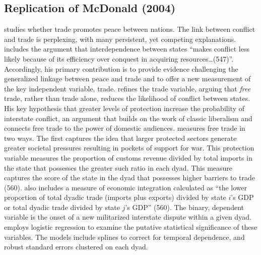 \subsection{Replication of McDonald (2004)}

\citet{mcdonald:2004} studies whether trade promotes peace between nations. The link between conflict and trade is perplexing, with many persistent, yet competing explanations. \citet{mcdonald:2004} includes the argument that interdependence between states ``makes conflict less likely because of its efficiency over conquest in acquiring resources\ldots (547)''. Accordingly, his primary contribution is to provide evidence challenging the generalized linkage between peace and trade and to offer a new measurement of the key independent variable, trade. \citet{mcdonald:2004} refines the trade variable, arguing that \textit{free} trade, rather than trade alone, reduces the likelihood of conflict between states. His key hypothesis that greater levels of protection increase the probability of interstate conflict, an argument that builds on the work of classic liberalism and connects free trade to the power of domestic audiences. \citet{mcdonald:2004} measures free trade in two ways. The first captures the idea that larger protected sectors generate greater societal pressures resulting in pockets of support for war. This protection variable measures the proportion of customs revenue divided by total imports in the state that possesses the greater such ratio in each dyad. This measure captures the score of the state in the dyad that possesses higher barriers to trade (560). \citet{mcdonald:2004} also includes a measure of economic integration  calculated as ``the lower proportion of total dyadic trade (imports plus exports) divided by state $i$'s GDP or total dyadic trade divided by state $j$'s GDP'' (560). The binary, dependent variable is the onset of a new militarized interstate dispute within a given dyad. \citet{mcdonald:2004} employs logistic regression to examine the putative statistical significance of these variables. The models include splines to correct for temporal dependence, and robust standard errors clustered on each dyad.

